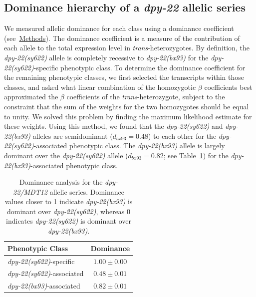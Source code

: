 \documentclass[9pt,twocolumn,twoside]{gsajnl}
\newcommand{\gene}[1]{\mbox{\emph{#1}}}
\newcommand{\dpy}[1]{\gene{dpy-22#1}}
\newcommand{\bx}{\dpy{(bx93)}}
\newcommand{\sy}{\dpy{(sy622)}}
\begin{document}
\subsection*{Dominance hierarchy of a \gene{dpy-22} allelic series}
We measured allelic dominance for each class using a dominance coefficient
(see~\hyperref[sec:methods]{Methods}). The dominance coefficient is a measure of
the contribution of each allele to the total expression level in
\emph{trans}-heterozygotes. By definition, the \sy{} allele is completely
recessive to \bx{} for the \sy{}-specific phenotypic class. To determine the
dominance coefficient for the remaining phenotypic classes, we first selected
the transcripts within those classes, and asked what linear combination of the
homozygotic $\beta$ coefficients best approximated the $\beta$ coefficients of
the \emph{trans}-heterozygote, subject to the constraint that the sum of the
weights for the two homozygotes should be equal to unity. We solved this problem
by finding the maximum likelihood estimate for these weights. Using this method,
we found that the \sy{} and \bx{} alleles are semidominant ($d_{bx93} = 0.48$)
to each other for the \sy{}-associated phenotypic class. The \bx{} allele is
largely  dominant over the \sy{} allele ($d_{bx93}=0.82$; see
Table~\ref{tab:dom}) for the \bx{}-associated phenotypic class.

\begin{table}
  \centering
  \begin{tabular}{lc}
    \toprule
    Phenotypic Class & Dominance\\
    \midrule
    \sy{}-specific & $1.00\pm0.00$\\
    \sy{}-associated & $0.48\pm0.01$\\
    \bx{}-associated & $0.82\pm0.01$\\
    \bottomrule
  \end{tabular}
  \caption{
           Dominance analysis for the \dpy{/MDT12} allelic series. Dominance
           values closer to 1 indicate \bx{} is dominant over \sy{}, whereas 0
           indicates \sy{} is dominant over \bx{}.
          }
\label{tab:dom}
\end{table}
\end{document}
